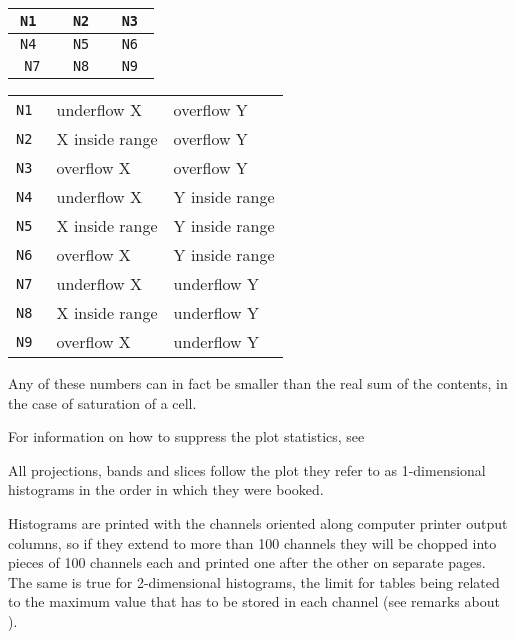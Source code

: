 \def\Rule{\rule[1.5ex]{0cm}{6ex}}
\begin{center}
\begin{tabular}{@{\qquad}>{\tt}c|@{\qquad}>{\tt}c@{\qquad}|>{\tt}c@{\qquad}}
      N1  &   N2   &  N3 \\ \hline
      N4  &   N5   &  N6 \\ \hline
      N7  &   N8   &  N9 
\end{tabular}
\end{center}
\begin{tabular}{>{\tt}l@{\quad=\quad}l@{\quad,\quad}l}
 N1   & underflow X      & overflow Y     \\
 N2   & X inside range   & overflow Y     \\
 N3   & overflow X       & overflow Y     \\
 N4   & underflow X      & Y inside range \\
 N5   & X inside range   & Y inside range \\
 N6   & overflow X       & Y inside range \\
 N7   & underflow X      & underflow Y    \\
 N8   & X inside range   & underflow Y    \\
 N9   & overflow X       & underflow Y    \\
\end{tabular}
\NODOC{\end{minipage}}
 
Any of these numbers can in fact be smaller than the real sum
of the contents, in the case of saturation of a cell.
 
For information on how to suppress the plot statistics, see
 
All projections, bands and slices follow the plot they refer
to as
1-dimensional histograms in the order in which they were booked.
 
Histograms are printed with the channels oriented along computer
printer output columns, so if they extend to more than 100 channels
they will be chopped into pieces of 100 channels each and printed one after
the other on separate pages. The same is true for 2-dimensional histograms,
the limit for tables being related to the maximum value that has to
be stored in each channel (see remarks about ).
 
